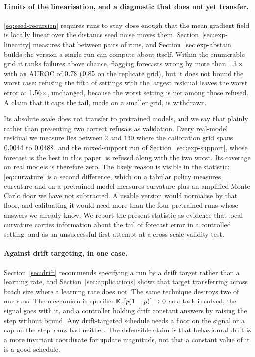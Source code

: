 \paragraph{Limits of the linearisation, and a diagnostic that does not yet transfer.}
\eqref{eq:seed-recursion} requires runs to stay close enough that the mean gradient field is
locally linear over the distance seed noise moves them. Section~\ref{sec:exp-linearity} measures
that between pairs of runs, and Section~\ref{sec:exp-abstain} builds the version a single run can
compute about itself. Within the enumerable grid it ranks failures above chance, flagging
forecasts wrong by more than $1.3\times$ with an AUROC of $0.78$ ($0.85$
on the replicate grid), but it does not bound the worst case: refusing the fifth of settings with
the largest residual leaves the worst error at $1.56\times$, unchanged, because the
worst setting is not among those refused. A claim that it caps the tail, made on a smaller grid,
is withdrawn.

Its absolute scale does not transfer to pretrained models, and we say that plainly rather than
presenting two correct refusals as validation. Every real-model residual we measure lies between
$2$ and $160$ where the calibration grid spans $0.0044$ to $0.0488$, and the
mixed-support run of Section~\ref{sec:exp-support}, whose forecast is the best in this paper, is
refused along with the two worst. Its coverage on real models is therefore zero. The likely reason
is visible in the statistic: \eqref{eq:curvature} is a second difference, which on a tabular policy
measures curvature and on a pretrained model measures curvature plus an amplified Monte Carlo
floor we have not subtracted. A usable version would normalise by that floor, and calibrating it
would need more than the four pretrained runs whose answers we already know. We report the
present statistic as evidence that local curvature carries information about the tail of forecast
error in a controlled setting, and as an unsuccessful first attempt at a cross-scale validity test.

\paragraph{Against drift targeting, in one case.} Section~\ref{sec:drift} recommends specifying a
run by a drift target rather than a learning rate, and Section~\ref{sec:applications} shows that
target transferring across batch size where a learning rate does not. The same technique destroys
two of our runs. The mechanism is specific: $\mathbb{E}_x[p(1-p)] \to 0$ as a task is solved, the signal
goes with it, and a controller holding drift constant answers by raising the step without bound.
Any drift-targeted schedule needs a floor on the signal or a cap on the step; ours had neither. The
defensible claim is that behavioural drift is a more invariant coordinate for update magnitude, not
that a constant value of it is a good schedule.

